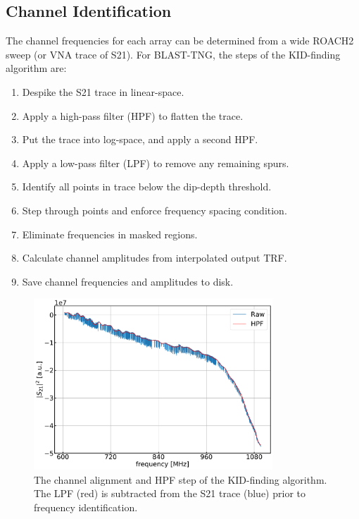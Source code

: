 \subsection{Channel Identification}\label{KID-finding}

The channel frequencies for each array can be determined from a wide ROACH2 sweep (or VNA trace of \gls{S21}). For BLAST-TNG, the steps of the KID-finding algorithm are:

\begin{enumerate}[nosep]
  \item Despike the \gls{S21} trace in linear-space.
  \item Apply a high-pass filter (HPF) to flatten the trace.
  \item Put the trace into log-space, and apply a second HPF.
  \item Apply a low-pass filter (LPF) to remove any remaining spurs.
  \item Identify all points in trace below the dip-depth threshold.
  \item Step through points and enforce frequency spacing condition.
  \item Eliminate frequencies in masked regions.
  \item Calculate channel amplitudes from interpolated output TRF.
  \item Save channel frequencies and amplitudes to disk.
\end{enumerate}

\vspace{5mm}

\begin{figure}[!htbp]
\centering
\includegraphics[width=0.8\textwidth]{figures/blast_data/sweeps/350FK_HPF_PAL}
\caption[~The channel alignment and HPF step of the KID-finding algorithm.]{The channel alignment and HPF step of the KID-finding algorithm. The LPF (red) is subtracted from the \gls{S21} trace (blue) prior to frequency identification.}
\label{fig:350FK_HPF}
\end{figure}

